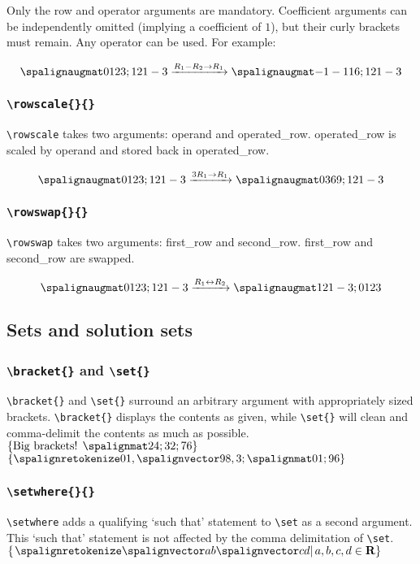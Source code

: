 \documentclass{article}
\begin{document}
Only the row and operator arguments are mandatory. Coefficient arguments can be independently omitted (implying a coefficient of $1$), but their curly brackets must remain. Any operator can be used. For example:

\LTXexample[style=A]
\[\amat{0 1 2 3; 1 2 1 -3}
\rowop{}{1}{-}{}{2}
\amat{-1 -1 1 6; 1 2 1 -3}\]
\endLTXexample

\subsubsection{\texttt{\textbackslash rowscale\{\}\{\}}}
\verb=\rowscale= takes two arguments: operand and operated\_row. operated\_row is scaled by operand and stored back in operated\_row.

\LTXexample[style=A]
\[\amat{0 1 2 3; 1 2 1 -3}
\rowscale{3}{1}
\amat{0 3 6 9; 1 2 1 -3}\]
\endLTXexample

\subsubsection{\texttt{\textbackslash rowswap\{\}\{\}}}
\verb=\rowswap= takes two arguments: first\_row and second\_row. first\_row and second\_row are swapped.

\LTXexample[style=A]
\[\amat{0 1 2 3; 1 2 1 -3}
\rowswap{1}{2}
\amat{1 2 1 -3; 0 1 2 3}\]
\endLTXexample

\subsection{Sets and solution sets}

\subsubsection{\texttt{\textbackslash bracket\{\}} and \texttt{\textbackslash set\{\}}}
\verb=\bracket{}= and \verb=\set{}= surround an arbitrary argument with appropriately sized brackets. \verb=\bracket{}= displays the contents as given, while \verb=\set{}= will clean and comma-delimit the contents as much as possible.
\LTXexample[style=A]
$\bracket{\text{Big brackets! }\mat{2 4; 3 2; 7 6}}$
\endLTXexample
\LTXexample[style=A]
$\set{0 1, \vct{9 8},3; \mat{0 1; 9 6}}$
\endLTXexample
\subsubsection{\texttt{\textbackslash setwhere\{\}\{\}}}
\verb=\setwhere= adds a qualifying `such that' statement to \verb=\set= as a second argument. This `such that' statement is not affected by the comma delimitation of \verb=\set=.
\LTXexample[style=A]
$\setwhere{\vct{a b} \vct{c d}}{a,b,c,d \in \mathbf{R}}$
\endLTXexample
\end{document}
